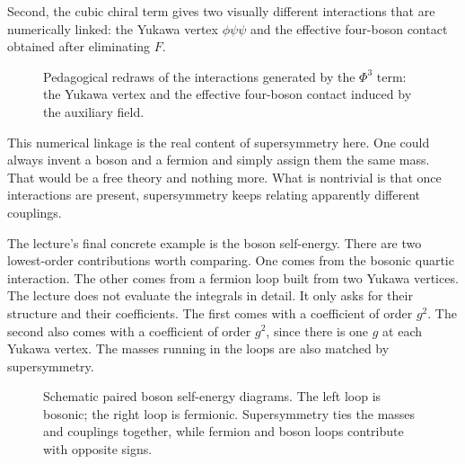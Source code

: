 Second, the cubic chiral term gives two visually different interactions that are numerically linked: the Yukawa vertex \(\phi\psi\psi\) and the effective four-boson contact obtained after eliminating \(F\).

\begin{figure}
\centering
{}
\qquad
{}
\caption{Pedagogical redraws of the interactions generated by the \(\Phi^3\) term: the Yukawa vertex and the effective four-boson contact induced by the auxiliary field.}
\end{figure}

This numerical linkage is the real content of supersymmetry here. One could always invent a boson and a fermion and simply assign them the same mass. That would be a free theory and nothing more. What is nontrivial is that once interactions are present, supersymmetry keeps relating apparently different couplings.

The lecture's final concrete example is the boson self-energy. There are two lowest-order contributions worth comparing. One comes from the bosonic quartic interaction. The other comes from a fermion loop built from two Yukawa vertices. The lecture does not evaluate the integrals in detail. It only asks for their structure and their coefficients. The first comes with a coefficient of order \(g^2\). The second also comes with a coefficient of order \(g^2\), since there is one \(g\) at each Yukawa vertex. The masses running in the loops are also matched by supersymmetry.

\begin{figure}
\centering
{}
\qquad
{}
\caption{Schematic paired boson self-energy diagrams. The left loop is bosonic; the right loop is fermionic. Supersymmetry ties the masses and couplings together, while fermion and boson loops contribute with opposite signs.}
\end{figure}


